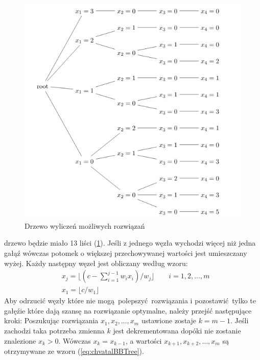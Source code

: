 \begin{figure}
  \includegraphics[width=\textwidth,center]{../image/chvatal_book_sample.png}%
  \caption{Drzewo wyliczeń możliwych rozwiązań}
  \label{fig:chvatalBBTree}
\end{figure}
drzewo będzie miało 13 liści (\cref{fig:chvatalBBTree}). Jeśli z jednego węzła wychodzi więcej niż jedna gałąź wówczas potomek o większej przechowywanej wartości jest umieszczany wyżej. Każdy następny węzeł jest obliczany według wzoru:
\begin{equation*}\label{eq:chvatalBBTree}
  \begin{aligned}
    & x_j = \lfloor{(c - \sum_{i=1}^{j-1}w_ix_i)/w_j}\rfloor \qquad i = 1,2,\dots,m \\
    & x_1 = \lfloor{c/w_1}\rfloor
  \end{aligned}
\end{equation*}
Aby odrzucić węzły które nie mogą polepszyć rozwiązania i pozostawić tylko te gałęźie które dają szansę na rozwiązanie optymalne, należy przejść następujące kroki:
Poszukując rozwiązania $x_1,x_2,\dots,x_m$ ustawione zostaje $k = m-1$. Jeśli zachodzi taka potrzeba zmienna $k$ jest dekrementowana dopóki nie zostanie znalezione $x_k > 0$. Wówczas $x_k = x_{k-1}$, a wartości $x_{k+1}, x_{k+2}, \dots,x_m$ są otrzymywane ze wzoru (\cref{eq:chvatalBBTree}).

